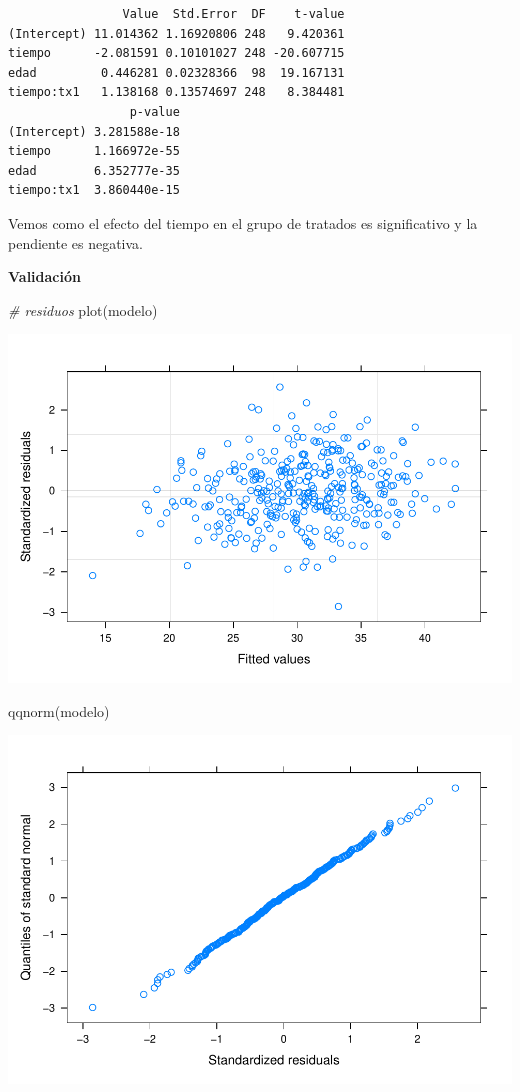 \documentclass[
]{book}
\newenvironment{Shaded}{\begin{snugshade}}{\end{snugshade}}
\newcommand{\CommentTok}[1]{\textcolor[rgb]{0.56,0.35,0.01}{\textit{#1}}}
\newcommand{\FunctionTok}[1]{\textcolor[rgb]{0.00,0.00,0.00}{#1}}
\newcommand{\NormalTok}[1]{#1}
\begin{document}
\begin{verbatim}
                Value  Std.Error  DF    t-value
(Intercept) 11.014362 1.16920806 248   9.420361
tiempo      -2.081591 0.10101027 248 -20.607715
edad         0.446281 0.02328366  98  19.167131
tiempo:tx1   1.138168 0.13574697 248   8.384481
                 p-value
(Intercept) 3.281588e-18
tiempo      1.166972e-55
edad        6.352777e-35
tiempo:tx1  3.860440e-15
\end{verbatim}

Vemos como el efecto del tiempo en el grupo de tratados es significativo y la pendiente es negativa.

\textbf{Validación}

\begin{Shaded}
\begin{Highlighting}[]
\CommentTok{\# residuos}
\FunctionTok{plot}\NormalTok{(modelo)}
\end{Highlighting}
\end{Shaded}

\includegraphics{fig_out/unnamed-chunk-142-1.pdf}

\begin{Shaded}
\begin{Highlighting}[]
\FunctionTok{qqnorm}\NormalTok{(modelo)}
\end{Highlighting}
\end{Shaded}

\includegraphics{fig_out/unnamed-chunk-142-2.pdf}
\end{document}
